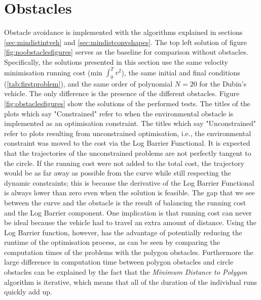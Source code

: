 \section{Obstacles}

\par Obstacle avoidance is implemented with the algorithms explained in sections \ref{sec:mindistintveh} and \ref{sec:mindistconvshapes}. The top left solution of figure \ref{fig:noobstaclesfigures} serves as the baseline for comparison without obstacles. Specifically, the solutions presented in this section use the same velocity minimisation running cost (min $\int_0^T v^2$), the same initial and final conditions (\ref{tab:firstproblem}), and the same order of polynomial $N=20$ for the Dubin's vehicle. The only difference is the presence of the different obstacles. Figure \ref{fig:obstaclesfigures} show the solutions of the performed tests. The titles of the plots which say "Constrained" refer to when the environmental obstacle is implemented as an optimisation constraint. The titles which say "Unconstrained" refer to plots resulting from unconstrained optimisation, i.e., the environmental constraint was moved to the cost via the Log Barrier Functional. It is expected that the trajectories of the unconstrained problems are not perfectly tangent to the circle. If the running cost were not added to the total cost, the trajectory would be as far away as possible from the curve while still respecting the dynamic constraints; this is because the derivative of the Log Barrier Functional is always lower than zero even when the solution is feasible. The gap that we see between the curve and the obstacle is the result of balancing the running cost and the Log Barrier component. One implication is that running cost can never be ideal because the vehicle had to travel an extra amount of distance. Using the Log Barrier function, however, has the advantage of potentially reducing the runtime of the optimisation process, as can be seen by comparing the computation times of the problems with the polygon obstacles. Furthermore the large difference in computation time between polygon obstacles and circle obstacles can be explained by the fact that the \textit{Minimum Distance to Polygon} algorithm is iterative, which means that all of the duration of the individual runs quickly add up.


